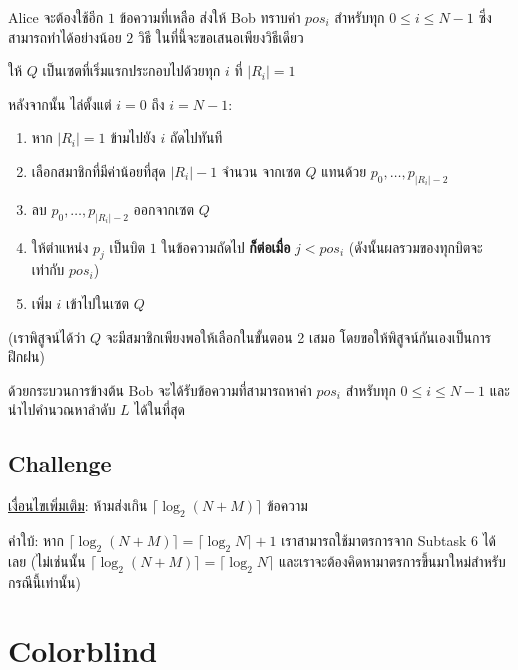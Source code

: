 \documentclass[12pt]{article}
\begin{document}
Alice จะต้องใช้อีก $1$ ข้อความที่เหลือ ส่งให้ Bob ทราบค่า $pos_i$ สำหรับทุก $0 \leq i \leq N-1$ ซึ่งสามารถทำได้อย่างน้อย $2$ วิธี ในที่นี้จะขอเสนอเพียงวิธีเดียว

ให้ $Q$  เป็นเซตที่เริ่มแรกประกอบไปด้วยทุก $i$ ที่ $|R_i| = 1$

หลังจากนั้น ไล่ตั้งแต่ $i = 0$  ถึง $i = N-1$:
\begin{enumerate}[itemsep=1pt,parsep=1pt]
\item หาก $|R_i| = 1$ ข้ามไปยัง $i$ ถัดไปทันที
\item เลือกสมาชิกที่มีค่าน้อยที่สุด $|R_i|-1$ จำนวน จากเซต $Q$ แทนด้วย $p_0, \ldots, p_{|R_i|-2}$
\item ลบ $p_0, \ldots, p_{|R_i|-2}$  ออกจากเซต $Q$
\item ให้ตำแหน่ง $p_j$ เป็นบิต $1$ ในข้อความถัดไป \textbf{ก็ต่อเมื่อ} $j < pos_i$  (ดังนั้นผลรวมของทุกบิตจะเท่ากับ $pos_i$)
\item เพิ่ม $i$  เข้าไปในเซต $Q$
\end{enumerate}

(เราพิสูจน์ได้ว่า $Q$ จะมีสมาชิกเพียงพอให้เลือกในขั้นตอน 2 เสมอ โดยขอให้พิสูจน์กันเองเป็นการฝึกฝน)

ด้วยกระบวนการข้างต้น Bob จะได้รับข้อความที่สามารถหาค่า $pos_i$  สำหรับทุก $0 \leq i \leq N-1$  และนำไปคำนวณหาลำดับ $L$  ได้ในที่สุด

\subsection{Challenge}

\underline{เงื่อนไขเพิ่มเติม}: ห้ามส่งเกิน $\lceil \log_2 (N+M) \rceil$ ข้อความ

คำใบ้: หาก $\lceil \log_2 (N+M) \rceil = \lceil \log_2 N \rceil + 1$ เราสามารถใช้มาตรการจาก Subtask 6 ได้เลย (ไม่เช่นนั้น $\lceil \log_2 (N+M) \rceil = \lceil \log_2 N \rceil$ และเราจะต้องคิดหามาตรการขึ้นมาใหม่สำหรับกรณีนี้เท่านั้น)

\newpage


























\section{Colorblind}
\end{document}
